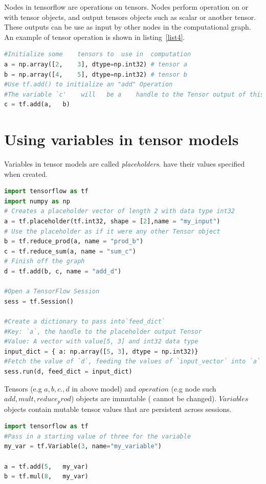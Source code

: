 \documentclass[vecarrow]{svproc}
\begin{document}
Nodes in tensorflow are operations on tensors. Nodes perform operation on or with tensor objects, and output tensors objects such as scalar or another tensor. These outputs can be use as input by other nodes in the computational graph. An example of tensor operation is shown in listing~\ref{list4}.

\begin{lstlisting}[language=Python, 
caption={operations on tensors},label={list4}]
#Initialize	some	tensors	to	use	in	computation
a = np.array([2,	3],	dtype=np.int32) # tensor a
b =	np.array([4,	5],	dtype=np.int32) # tensor b
#Use tf.add() to initialize an "add" Operation
#The variable `c'	 will	be a	handle to the Tensor output of this	Op
c = tf.add(a,	b)
\end{lstlisting}

\section{Using variables in tensor models}

Variables in tensor models are called \textit{placeholders}. have their values specified when created.

\begin{lstlisting}[language=Python, 
caption={use placeholders in tensor},label={list5}]
import tensorflow as tf
import numpy as np
# Creates a placeholder vector of length 2 with data type int32
a = tf.placeholder(tf.int32, shape = [2],name = "my_input")
# Use the placeholder as if it were any other Tensor object
b = tf.reduce_prod(a, name = "prod_b")
c = tf.reduce_sum(a, name = "sum_c")
# Finish off the graph
d = tf.add(b, c, name = "add_d")

#Open a TensorFlow Session
sess = tf.Session()

#Create a dictionary to pass into`feed_dict`
#Key: `a`, the handle to the placeholder output Tensor
#Value: A vector with value[5, 3] and int32 data type
input_dict = { a: np.array([5, 3], dtype = np.int32)}
#Fetch the value of `d`, feeding the values of `input_vector` into `a`
sess.run(d, feed_dict = input_dict)
\end{lstlisting}

Tensors (e.g $a, b , c., d$ in above model)  and $operation$ (e.g node such 
$add, mult, reduce_prod$)
objects are immutable ( cannot be changed). $Variables$ objects contain
mutable tensor values that are persistent across sessions.

\begin{lstlisting}[language=Python, 
caption={use placeholders in tensor},label={list6}]
import tensorflow as tf
#Pass in a starting value of three for the variable
my_var = tf.Variable(3, name="my_variable")

a = tf.add(5,	my_var)
b =	tf.mul(8,	my_var)
\end{lstlisting}
\end{document}
